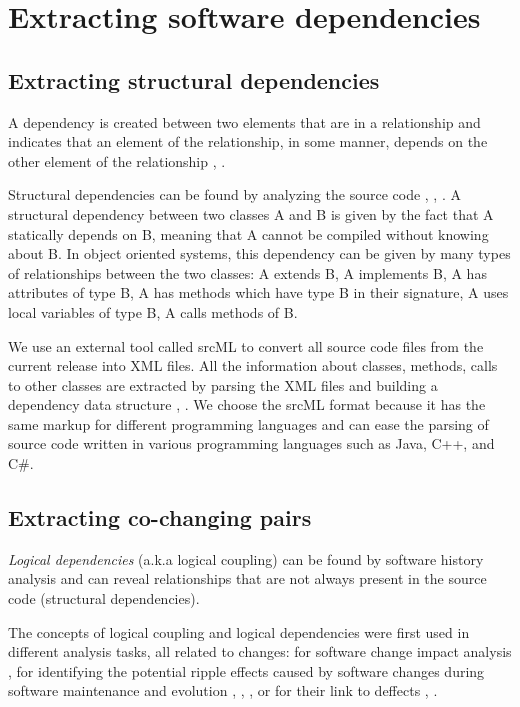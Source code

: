 \chapter{Extracting software dependencies}
\label{extraction}


\section{Extracting structural dependencies}
\label{sec:sd_extraction}
A dependency is created between two elements that are in a relationship and indicates that an element of the relationship, in some manner, depends on the other element of the relationship \cite{Booch:2004:OAD:975416}, \cite{Cataldo2009SoftwareDW}.

Structural dependencies can be found by analyzing the source code \cite{Sangal:2005:UDM:1094811.1094824}, \cite{CalloArias2011}, \cite{structdep}. A structural dependency between two classes A and B is given by the fact that A statically depends on B, meaning that A cannot be compiled without knowing about B. In object oriented systems, this dependency can be given by many types of relationships between the two classes: A extends B, A implements B, A has attributes of type B, A has methods which have type B in their signature, A uses local variables of type B, A calls methods of B.


 We use an external tool called srcML \cite{srcML} to convert all source code files from the current release into XML files. All the information about classes, methods, calls to other classes are extracted by parsing the XML files and building a dependency data structure \cite{2003:XLC:851042.857028},
\cite{Collard:2011:LTF:2067850.2068011}. We choose the srcML format because it has the same markup for different programming languages and can ease the parsing of source code written in various programming languages such as Java, C++, and C\#.


\section{Extracting co-changing pairs}
\label{sec:copairs_extraction}

\textit{Logical dependencies} (a.k.a logical coupling) can be found by software history analysis and can reveal relationships that are not always present in the source code (structural dependencies).  

The concepts of logical coupling and logical dependencies were first used in different analysis tasks, all related to changes: for software change impact analysis \cite{1553643}, for identifying the potential ripple effects caused by software changes during software maintenance and evolution \cite{DBLP:conf/issre/OlivaG15}, \cite{Oliva:2011:ISL:2067853.2068086}, \cite{Poshyvanyk2009}, \cite{posh2010} or for their link to deffects \cite{wiese}, \cite{Zimmermann:2004:MVH:998675.999460}.

